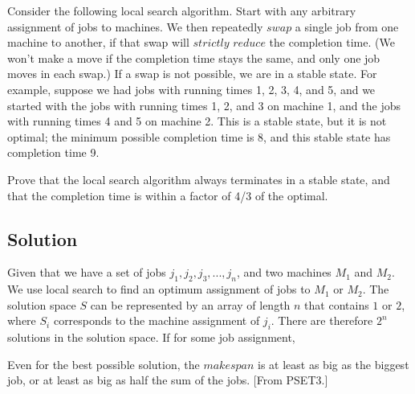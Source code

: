 \documentclass[11pt]{article}
\begin{document}
Consider the following local search algorithm. Start with any arbitrary assignment of jobs to machines. We then repeatedly $swap$ a single job from one machine to another, if that swap will $strictly$ $reduce$ the completion time. (We won't make a move if the completion time stays the same, and only one job moves in each swap.) If a swap is not possible, we are in a stable state. For example, suppose we had jobs with running times 1, 2, 3, 4, and 5, and we started with the jobs with running times 1, 2, and 3 on machine 1, and the jobs with running times 4 and 5 on machine 2. This is a stable state, but it is not optimal; the minimum possible completion time is 8, and this stable state has completion time 9.

Prove that the local search algorithm always terminates in a stable state, and that the completion time is within a factor of 4/3 of the optimal.

\subsection{Solution}
Given that we have a set of jobs $j_1, j_2, j_3,..., j_n$, and two machines $M_1$ and $M_2$. We use local search to find an optimum assignment of jobs to $M_1$ or $M_2$. The solution space $S$ can be represented by an array of length $n$ that contains $1$ or $2$, where $S_i$ corresponds to the machine assignment of $j_i$. There are therefore $2^n$ solutions in the solution space. 
	If for some job assignment, 
	
	Even for the best possible solution, the $makespan$ is at least as big as the biggest job, or at least as big as half the sum of the jobs. [From PSET3.]
\end{document}
